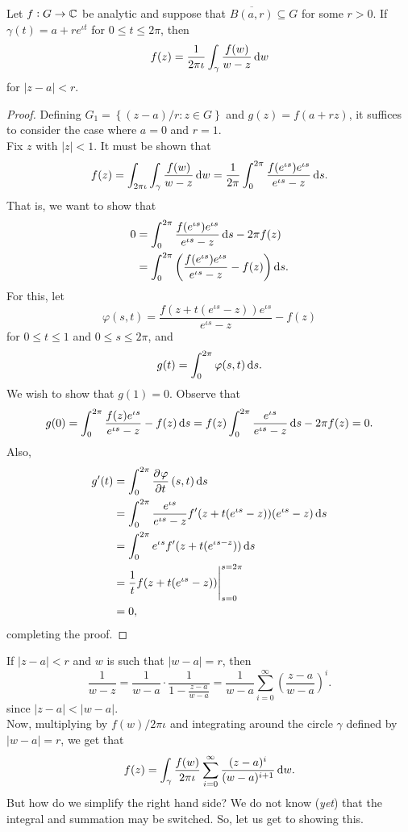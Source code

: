 	\begin{ftheo}
		Let $f : G \to \mathbb{C}$ be analytic and suppose that $\overline{B(a,r)} \subseteq G$ for some $r > 0$. If $\gamma(t) = a + re^{\iota t}$ for $ 0 \le t \le 2\pi$, then
		\[ f(z) = \frac{1}{2\pi\iota} \int_\gamma \frac{f(w)}{w - z} \dif w \]
		for $|z-a| < r$.
	\end{ftheo}
	\begin{proof}
		Defining $G_1 = \left\{ (z-a)/r : z \in G \right\}$ and $g(z) = f(a + r z)$, it suffices to consider the case where $a = 0$ and $r = 1$.\\
		Fix $z$ with $|z| < 1$. It must be shown that
		\[ f(z) = \int_{2\pi\iota} \int_\gamma \frac{f(w)}{w-z} \dif w = \frac{1}{2\pi} \int_0^{2\pi} \frac{f(e^{\iota s}) e^{\iota s}}{e^{\iota s} - z} \dif s. \]
		That is, we want to show that
		\begin{align*}
			 0 &= \int_0^{2\pi} \frac{f(e^{\iota s}) e^{\iota s}}{e^{\iota s} - z} \dif s - 2 \pi f(z) \\
			 	&= \int_0^{2\pi} \left(\frac{f(e^{\iota s}) e^{\iota s}}{e^{\iota s} - z} - f(z)\right) \dif s.
		\end{align*}
		For this, let
		\[ \varphi(s,t) = \frac{f(z + t(e^{\iota s} - z)) e^{\iota s}}{e^{\iota s} - z} - f(z) \]
		for $0 \le t \le 1$ and $0 \le s \le 2\pi$, and
		\[ g(t) = \int_0^{2\pi} \varphi(s,t) \dif s. \]
		We wish to show that $g(1) = 0$. Observe that
		\[ g(0) = \int_0^{2\pi} \frac{f(z) e^{\iota s}}{e^{\iota s} - z} - f(z) \dif s = f(z) \int_0^{2\pi} \frac{e^{\iota s}}{e^{\iota s} - z} \dif s - 2\pi f(z) = 0. \]
		Also,
		\begin{align*}
			g'(t) &= \int_0^{2\pi} \dpd{\varphi}{t}(s,t) \dif s \\
				&= \int_0^{2\pi} \frac{e^{\iota s}}{e^{\iota s} - z} f'(z + t(e^{\iota s} - z)) (e^{\iota s} - z) \dif s \\
				&= \int_0^{2\pi} e^{\iota s} f'(z + t(e^{\iota s - z})) \dif s \\
				&= \frac{1}{t} f(z + t(e^{\iota s} - z)) \Biggr|_{s=0}^{s=2\pi} \\
				&= 0,
		\end{align*}
		completing the proof.
	\end{proof}

	If $|z-a| < r$ and $w$ is such that $|w-a| = r$, then
	\[ \frac{1}{w-z} = \frac{1}{w-a} \cdot \frac{1}{1 - \frac{z-a}{w-a}} = \frac{1}{w-a} \sum_{i=0}^{\infty} \left( \frac{z-a}{w-a} \right)^i. \]
	since $|z-a| < |w-a|$.\\
	Now, multiplying by $f(w)/2\pi\iota$ and integrating around the circle $\gamma$ defined by $|w-a|=r$, we get that
	\[ f(z) = \int_\gamma \frac{f(w)}{2\pi\iota} \sum_{i=0}^\infty \frac{(z-a)^{i}}{(w-a)^{i+1}} \dif w. \]
	But how do we simplify the right hand side? We do not know (\emph{yet}) that the integral and summation may be switched. So, let us get to showing this.

